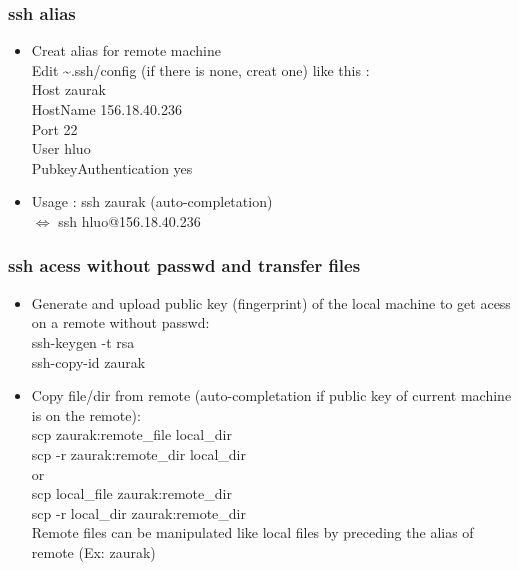 \documentclass{beamer}
\begin{document}


\begin{frame}
\frametitle{ssh alias}
\begin{itemize}
	\item Creat alias for remote machine \\
	      Edit \~\thinspace .ssh/config (if there is none, creat one) like this :\\
	      Host zaurak \\
	      	HostName 156.18.40.236 \\
	  	Port 22 \\
		User hluo \\ 
		PubkeyAuthentication yes \\
	\item Usage : ssh zaurak (auto-completation) \\
		$\iff$ ssh hluo@156.18.40.236
\end{itemize}
\end{frame}

\begin{frame}
\frametitle{ssh acess without passwd and transfer files}
\begin{itemize}
	\item Generate and upload public key (fingerprint) of the local machine to get acess on a remote without passwd:\\
	          ssh-keygen -t rsa \\
		  ssh-copy-id zaurak
		  
	\item Copy file/dir from remote (auto-completation if public key of current machine is on the remote): \\
			scp zaurak:remote\_file local\_dir \\
			scp -r zaurak:remote\_dir local\_dir \\
			or \\
			scp local\_file zaurak:remote\_dir \\
			scp -r local\_dir zaurak:remote\_dir \\
			Remote files can be manipulated like local files by preceding the alias of remote (Ex: zaurak)
\end{itemize}
\end{frame}

\end{document}
